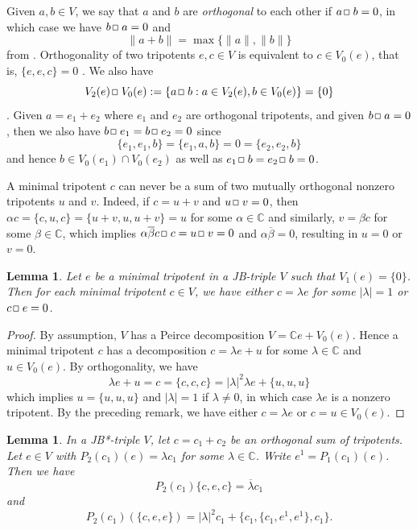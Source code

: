 \documentclass[12pt, twoside]{article}
\def\sqr#1#2{{\,\vcenter{\vbox{\hrule height.#2pt\hbox{\vrule width.#2pt
height#1pt \kern#1pt\vrule width.#2pt}\hrule height.#2pt}}\,}}
\def\bo{\sqr44\,}
\newtheorem{lemma}[theorem]{Lemma}
\theoremstyle{definition}
\numberwithin{equation}{section}
\begin{document}
Given $a,b\in V$, we say that $a$ and $b$ are {\it orthogonal} to each other if  $a \bo b =0$,
in which case we have $b\bo a =0$ and
\begin{equation}\label{osum}
\|a+ b\|= \max\{\|a\|, \|b\|\}
\end{equation}
from \cite[Corollary 3.1.21]{book}. Orthogonality of two tripotents $e,c\in V$ is equivalent to
$c\in V_0(e)$, that is, $\{e,e,c\}=0$ \cite[Corollary 1.2.46]{book}.
We also  have
$$V_2(e) \bo V_0(e) := \{ a\bo b: a\in V_2(e), b\in V_0(e)\} = \{0\}$$
\cite[Theorem 1.2.44]{book}. Given $a= e_1 + e_2$ where $e_1$
and $e_2$ are orthogonal tripotents, and given $b\bo a=0$, then we also have $b\bo e_1 = b \bo e_2 =0$ since
$$\{e_1,e_1,b\} =\{e_1, a,b\}=0 =\{e_2,e_2,b\}$$
and hence $b \in V_0(e_1) \cap V_0(e_2)$ as well as $e_1 \bo b= e_2 \bo b =0$.

A minimal tripotent $c$ can never be a sum of two mutually orthogonal nonzero tripotents $u$ and $v$.
Indeed, if $c= u+v$ and $u\bo v=0$, then $\alpha c = \{c,u,c\} = \{u+v, u, u+v\} = u$ for some
$\alpha \in \mathbb{C}$ and similarly, $v= \beta c$ for some $\beta \in \mathbb{C}$, which implies
$\alpha \overline \beta c \bo c = u\bo v=0$ and $\alpha \overline \beta=0$, resulting in $u=0$ or $v=0$.


\begin{lemma}\label{24} Let $e$  be a minimal tripotent in a JB-triple $V$ such that $V_1(e)=\{0\}$.
Then for each minimal tripotent $c\in V$, we have either $c=\lambda e$ for some $|\lambda|=1$ or
$c \bo e=0$.
\end{lemma}
\begin{proof} By assumption, $V$ has a Peirce decomposition $V= \mathbb{C}e + V_0(e)$.
Hence a minimal tripotent $c$ has a decomposition $c= \lambda e + u$ for some $\lambda \in \mathbb{C}$ and
$u\in V_0(e)$.
By orthogonality, we have
$$\lambda e + u = c = \{c,c,c\} = |\lambda|^2\lambda e + \{u,u,u\}$$
which implies $u=\{u,u,u\}$ and $|\lambda|=1$ if $\lambda \neq 0$, in which case $\lambda e$ is a
nonzero tripotent.
By the preceding remark, we have either $c=\lambda e$ or $c=u \in V_0(e)$.
\end{proof}


\begin{lemma}\label{c(cee)c}In a JB*-triple $V$, let $c=  c_1+c_2$ be an orthogonal sum of tripotents.
 Let $e\in V$ with $P_2(c_1)(e)= \lambda c_1$ for some $\lambda \in \mathbb{C}$. Write
$e^1 = P_1(c_1)(e)$. Then we have
\begin{equation}\label{cee1}
P_2(c_1)\{c,e,c\} = \overline\lambda  c_1
\end{equation}
and
\begin{equation*}
P_2(c_1)( \{c, e,e\})= |\lambda|^2  c_1 +  \{c_1,\{c_1, e^1,e^1\}, c_1\}.
\end{equation*}
\end{lemma}
\end{document}
